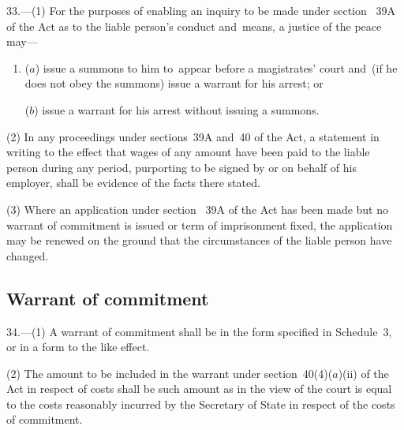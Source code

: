 \documentclass[12pt,a4paper]{article}
\begin{document}
33.—(1) For the purposes of enabling an inquiry to be made under section~%
39A  %
of the Act as to the liable person’s conduct and~means, a justice of the peace 
may—
\begin{enumerate}\item[]
($a$) issue a summons to him to~appear before a magistrates' court and~(if he does not obey the summons) issue a warrant for his arrest; or

($b$) issue a warrant for his arrest without issuing a summons.
\end{enumerate}

(2) In any proceedings under 
sections~39A and~40  %
of the Act, a statement in writing to the effect that wages of any amount have been paid to the liable person during any period, purporting to be signed by or on behalf of his employer, shall be evidence of the facts there stated.

(3) Where an application under section~%
39A  %
of the Act has been made but no warrant of commitment is issued or term of imprisonment fixed, the application may be renewed on the ground that the circumstances of the liable person have changed.


\subsection[34. Warrant of commitment]{Warrant of commitment}

34.—(1) A warrant of commitment shall be in the form specified in Schedule~3, or in a form to the like effect.

(2) The amount to be included in the warrant under section~40(4)($a$)(ii) of the Act in respect of costs shall be such amount as in the view of the court is equal to the costs reasonably incurred by the Secretary of State in respect of the costs of commitment.
\end{document}
